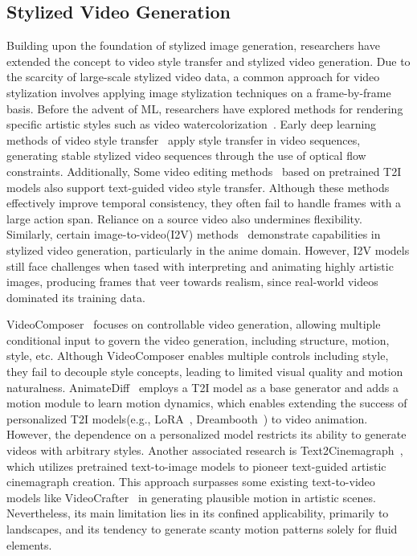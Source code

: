 \vspace{-0.7em}
\subsection{Stylized Video Generation}
Building upon the foundation of stylized image generation, researchers have extended the concept to video style transfer and stylized video generation. Due to the scarcity of large-scale stylized video data, a common approach for video stylization involves applying image stylization techniques on a frame-by-frame basis. Before the advent of ML, researchers have explored methods for rendering specific artistic styles such as video watercolorization~\cite{bousseau2007video}. Early deep learning methods of video style transfer~\cite{ruder2016artistic,chen2017coherent,texler2020interactive,gao2020fast,jamrivska2019stylizing,deng2021arbitrary} apply style transfer in video sequences, generating stable stylized video sequences through the use of optical flow constraints. 
Additionally, Some video editing methods~\cite{wu2023tune,qi2023fatezero,khachatryan2023text2video,huang2023style,yang2023rerender,geyer2023tokenflow,yang2024fresco} based on pretrained T2I models also support text-guided video style transfer. Although these methods effectively improve temporal consistency, they often fail to handle frames with a large action span. Reliance on a source video also undermines flexibility. 
Similarly, certain image-to-video(I2V) methods~\cite{blattmann2023stable, xing2023dynamicrafter, xing2024tooncrafter} demonstrate capabilities in stylized video generation, particularly in the anime domain. However, I2V models still face challenges when tased with interpreting and animating highly artistic images, producing frames that veer towards realism, since real-world videos dominated its training data.

VideoComposer~\cite{wang2024videocomposer} focuses on controllable video generation, allowing multiple conditional input to govern the video generation, including structure, motion, style, etc. Although VideoComposer enables multiple controls including style, they fail to decouple style concepts, leading to limited visual quality and motion naturalness. AnimateDiff~\cite{guo2023animatediff} employs a T2I model as a base generator and adds a motion module to learn motion dynamics, which enables extending the success of personalized T2I models(e.g., LoRA~\cite{hu2022lora}, Dreambooth~\cite{dreambooth}) to video animation. However, the dependence on a personalized model restricts its ability to generate videos with arbitrary styles. Another associated research is Text2Cinemagraph~\cite{mahapatra2023text}, which utilizes pretrained text-to-image models to pioneer text-guided artistic cinemagraph creation. This approach surpasses some existing text-to-video models like VideoCrafter~\cite{chen2023videocrafter} in generating plausible motion in artistic scenes. Nevertheless, its main limitation lies in its confined applicability, primarily to landscapes, and its tendency to generate scanty motion patterns solely for fluid elements.
